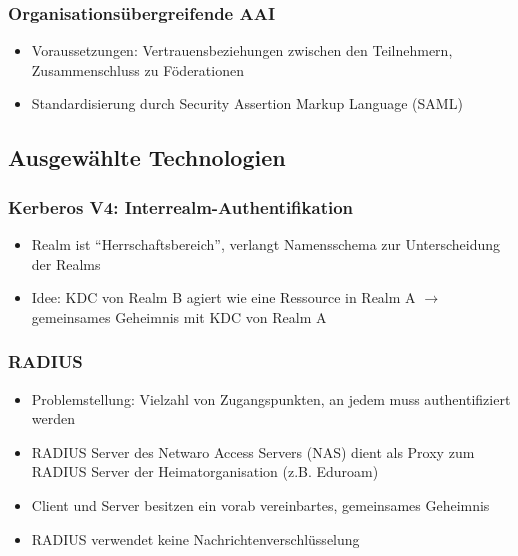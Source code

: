 \subsubsection{Organisationsübergreifende AAI}
\begin{itemize}
	\item Voraussetzungen: Vertrauensbeziehungen zwischen den Teilnehmern, Zusammenschluss zu Föderationen
	\item Standardisierung durch Security Assertion Markup Language (SAML)
\end{itemize}


\subsection{Ausgewählte Technologien}

\subsubsection{Kerberos V4: Interrealm-Authentifikation}
\begin{itemize}
	\item Realm ist "`Herrschaftsbereich"', verlangt Namensschema zur Unterscheidung der Realms
	\item Idee: KDC von Realm B agiert wie eine Ressource in Realm A $\rightarrow$ gemeinsames Geheimnis mit KDC von Realm A
\end{itemize}

\subsubsection{RADIUS}
\begin{itemize}
	\item Problemstellung: Vielzahl von Zugangspunkten, an jedem muss authentifiziert werden
	\item RADIUS Server des Netwaro Access Servers (NAS) dient als Proxy zum RADIUS Server der Heimatorganisation (z.B. Eduroam)
	\item Client und Server besitzen ein vorab vereinbartes, gemeinsames Geheimnis
	\item RADIUS verwendet keine Nachrichtenverschlüsselung
\end{itemize}

